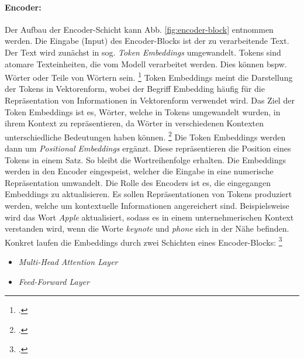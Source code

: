\paragraph{Encoder:}
Der Aufbau der Encoder-Schicht kann Abb. \ref{fig:encoder-block} entnommen werden. Die Eingabe (Input) des Encoder-Blocks ist der zu verarbeitende Text. Der Text wird zunächst in sog. \emph{Token Embeddings} umgewandelt. Tokens sind atomare Texteinheiten, die vom Modell verarbeitet werden. Dies können bspw. Wörter oder Teile von Wörtern sein. \footcites[Vgl.][S. 29]{tunstall_natural_2022} Token Embeddings meint die Darstellung der Tokens in Vektorenform, wobei der Begriff Embedding häufig für die Repräsentation von Informationen in Vektorenform verwendet wird. Das Ziel der Token Embeddings ist es, Wörter, welche in Tokens umgewandelt wurden, in ihrem Kontext zu repräsentieren, da Wörter in verschiedenen Kontexten unterschiedliche Bedeutungen haben können. \footcites[Vgl.][S. 692]{popa_towards_2021} Die Token Embeddings werden dann um \emph{Positional Embeddings} ergänzt. Diese repräsentieren die Position eines Tokens in einem Satz. So bleibt die Wortreihenfolge erhalten. Die Embeddings werden in den Encoder eingespeist, welcher die Eingabe in eine numerische Repräsentation umwandelt. Die Rolle des Encoders ist es, die eingegangen Embeddings zu aktualisieren. Es sollen Repräsentationen von Tokens produziert werden, welche um kontextuelle Informationen angereichert sind. Beispielsweise wird das Wort \emph{Apple} aktualisiert, sodass es in einem unternehmerischen Kontext verstanden wird, wenn die Worte \emph{keynote} und \emph{phone} sich in der Nähe befinden. Konkret laufen die Embeddings durch zwei Schichten eines Encoder-Blocks: \footcites[Vgl.][S. 58 ff.]{tunstall_natural_2022}
\begin{itemize}
    \item \emph{Multi-Head Attention Layer}
    \item \emph{Feed-Forward Layer}
\end{itemize}

